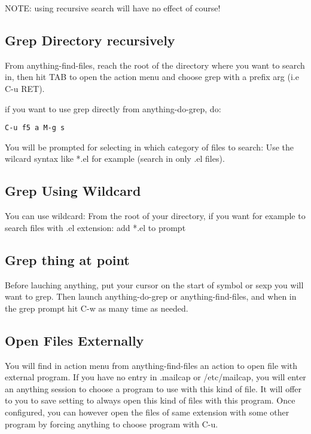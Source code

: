 \documentclass[a4paper,11pt]{article}
\begin{document}
NOTE: using recursive search will have no effect of course!

\subsection{Grep Directory recursively}
\label{sec:grep-direct-recurs}
From anything-find-files, reach the root of the directory where you want to search in,
then hit TAB to open the action menu and choose grep with a prefix arg (i.e C-u RET).

if you want to use grep directly from anything-do-grep, do:

\begin{verbatim}
C-u f5 a M-g s
\end{verbatim}

You will be prompted for selecting in which category of files to search:
Use the wilcard syntax like *.el for example (search in only .el files).


\subsection{Grep Using Wildcard}
\label{sec:grep-using-wildcard}
You can use wildcard:
From the root of your directory, if you want for example to search files with .el extension:
add *.el to prompt

\subsection{Grep thing at point}
\label{sec:grep-thing-at}
Before lauching anything, put your cursor on the start of symbol or sexp you will want to grep.
Then launch anything-do-grep or anything-find-files, and when in the grep prompt hit C-w as many time as needed.


\subsection{Open Files Externally}
\label{sec:open-files-extern}
You will find in action menu from anything-find-files an action to open file with external program.
If you have no entry in .mailcap or /etc/mailcap, you will enter an anything session to choose a program
to use with this kind of file.
It will offer to you to save setting to always open this kind of files with this program.
Once configured, you can however open the files of same extension with some other program by forcing anything
to choose program with C-u.
\end{document}
